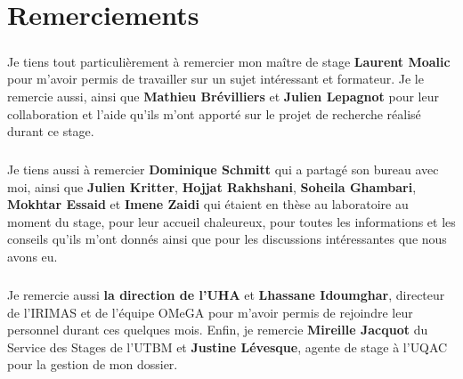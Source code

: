 \documentclass[a4paper,11pt,twoside,french,report]{../common/simplem}
\begin{document}
	\makeutbmfrontcover{}
	\chapter*{Remerciements}
		\paragraph*{}
			Je tiens tout particulièrement à remercier mon maître de stage \textbf{Laurent Moalic} pour m'avoir permis de travailler sur un sujet intéressant et formateur. Je le remercie aussi, ainsi que \textbf{Mathieu Brévilliers} et \textbf{Julien Lepagnot} pour leur collaboration et l'aide qu'ils m'ont apporté sur le projet de recherche réalisé durant ce stage.
		\paragraph*{}
			Je tiens aussi à remercier \textbf{Dominique Schmitt} qui a partagé son bureau avec moi, ainsi que \textbf{Julien Kritter}, \textbf{Hojjat Rakhshani}, \textbf{Soheila Ghambari}, \textbf{Mokhtar Essaid} et \textbf{Imene Zaidi} qui étaient en thèse au laboratoire au moment du stage, pour leur accueil chaleureux, pour toutes les informations et les conseils qu'ils m'ont donnés ainsi que pour les discussions intéressantes que nous avons eu.
		\paragraph*{}
			Je remercie aussi \textbf{la direction de l'UHA} et \textbf{Lhassane Idoumghar}, directeur de l'\acrshort{IRIMAS} et de l'équipe \acrshort{OMeGA} pour m'avoir permis de rejoindre leur personnel durant ces quelques mois. Enfin, je remercie \textbf{Mireille Jacquot} du Service des Stages de l'\acrshort{UTBM} et \textbf{Justine Lévesque}, agente de stage à l'\acrshort{UQAC} pour la gestion de mon dossier.
	\tableofcontents{}
\end{document}
